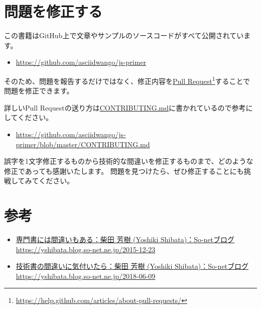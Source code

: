 \hypertarget{pull-request}{%
\section*{問題を修正する}\label{pull-request}}

この書籍はGitHub上で文章やサンプルのソースコードがすべて公開されています。

\begin{itemize}
\item
  \url{https://github.com/asciidwango/js-primer}
\end{itemize}

そのため、問題を報告するだけではなく、修正内容を\href{https://help.github.com/articles/about-pull-requests/}{Pull
Request}\footnote{\url{https://help.github.com/articles/about-pull-requests/}}することで問題を修正できます。

詳しいPull
Requestの送り方は\href{https://github.com/asciidwango/js-primer/blob/master/CONTRIBUTING.md}{CONTRIBUTING.md}に書かれているので参考にしてください。

\begin{itemize}
\item
  \url{https://github.com/asciidwango/js-primer/blob/master/CONTRIBUTING.md}
\end{itemize}

誤字を1文字修正するものから技術的な間違いを修正するものまで、どのような修正であっても感謝いたします。
問題を見つけたら、ぜひ修正することにも挑戦してみてください。

\hypertarget{reference}{%
\section*{参考}\label{reference}}

\begin{itemize}
\item
  \href{https://yshibata.blog.so-net.ne.jp/2015-12-23}{専門書には間違いもある：柴田
  芳樹 (Yoshiki Shibata)：So-netブログ}\\ \url{https://yshibata.blog.so-net.ne.jp/2015-12-23}
\item
  \href{https://yshibata.blog.so-net.ne.jp/2018-06-09}{技術書の間違いに気付いたら：柴田
  芳樹 (Yoshiki Shibata)：So-netブログ}\\ \url{https://yshibata.blog.so-net.ne.jp/2018-06-09}
\end{itemize}
